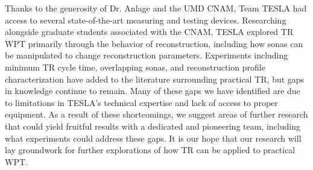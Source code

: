 Thanks to the generosity of Dr. Anlage and the UMD CNAM, Team TESLA had access to several state-of-the-art measuring and testing devices. Researching alongside graduate students associated with the CNAM, TESLA explored TR WPT primarily through the behavior of reconstruction, including how sonas can be manipulated to change reconstruction parameters.  Experiments including minimum TR cycle time, overlapping sonas, and reconstruction profile characterization have added to the literature surrounding practical TR, but gaps in knowledge continue to remain.  Many of these gaps we have identified are due to limitations in TESLA's technical expertise and lack of  access to proper equipment.  As a result of these shortcomings, we suggest areas of further research that could yield fruitful results with a dedicated and pioneering team, including what experiments could address these gaps.  It is our hope that our research will lay groundwork for further explorations of how TR can be applied to practical WPT.
